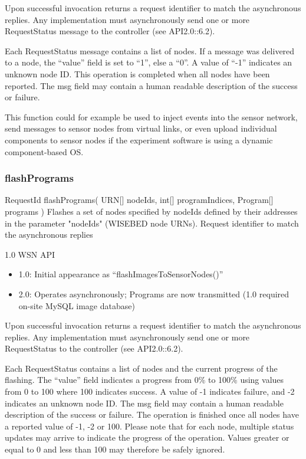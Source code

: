 Upon successful invocation returns a request identifier to match the asynchronous replies. Any implementation must asynchronously send one or more RequestStatus message to the controller (see API2.0::6.2).

Each RequestStatus message contains a list of nodes. If a message was delivered to a node, the ``value'' field is set to ``1'', else a ``0''. A value of ``-1'' indicates an unknown node ID. This operation is completed when all nodes have been reported. The msg field may contain a human readable description of the success or failure.

This function could for example be used to inject events into the sensor network, send messages to sensor nodes from virtual links, or even upload individual components to sensor nodes if the experiment software is using a dynamic component-based OS.

			\subsubsection{flashPrograms}

\begin{apidoc}
	{RequestId flashPrograms( URN[] nodeIds, int[] programIndices, Program[] programs )} %
	{Flashes a set of nodes specified by nodeIds defined by their addresses in the parameter "nodeIds" (WISEBED node URNs). } %
	{
	} %
	{Request identifier to match the asynchronous replies} %
	{ } %
	{1.0 WSN API
		\begin{itemize}
			\item 1.0: Initial appearance as ``flashImagesToSensorNodes()''
			\item 2.0: Operates asynchronously; Programs are now transmitted (1.0 required on-site MySQL image database)
		\end{itemize}	
	} %
\end{apidoc}

Upon successful invocation returns a request identifier to match the asynchronous replies. Any implementation must asynchronously send one or more RequestStatus to the controller (see API2.0::6.2). 

Each RequestStatus contains a list of nodes and the current progress of the flashing. The ``value'' field indicates a progress from 0\% to 100\% using values from 0 to 100 where 100 indicates success. A value of -1 indicates failure, and -2 indicates an unknown node ID. The msg field may contain a human readable description of the success or failure. The operation is finished once all nodes have a reported value of -1, -2 or 100. Please note that for each node, multiple status updates may arrive to indicate the progress of the operation. Values greater or equal to 0 and less than 100 may therefore be safely ignored.  

